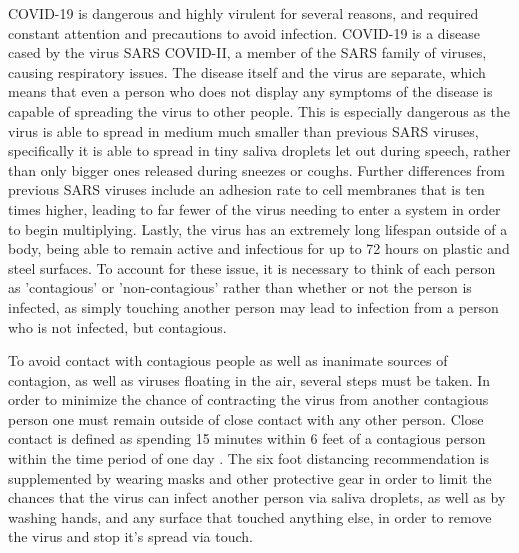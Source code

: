 \documentclass[12pt]{article}
\begin{document}
COVID-19 is dangerous and highly virulent for several reasons, and required constant attention and precautions to avoid infection.
COVID-19 is a disease cased by the virus SARS COVID-II, a member of the SARS family of viruses, causing respiratory issues.
The disease itself and the virus are separate, which means that even a person who does not display any symptoms of the disease is capable of spreading the virus to other people.
This is especially dangerous as the virus is able to spread in medium much smaller than previous SARS viruses, specifically it is able to spread in tiny saliva droplets let out during speech, rather than only bigger ones released during sneezes or coughs.
Further differences from previous SARS viruses include an adhesion rate to cell membranes that is ten times higher, leading to far fewer of the virus needing to enter a system in order to begin multiplying.
Lastly, the virus has an extremely long lifespan outside of a body, being able to remain active and infectious for up to 72 hours on plastic and steel surfaces.
To account for these issue, it is necessary to think of each person as 'contagious' or 'non-contagious' rather than whether or not the person is infected, as simply touching another person may lead to infection from a person who is not infected, but contagious. 

To avoid contact with contagious people as well as inanimate sources of contagion, as well as viruses floating in the air, several steps must be taken.
In order to minimize the chance of contracting the virus from another contagious person one must remain outside of close contact with any other person.
Close contact is defined as spending 15 minutes within 6 feet of a contagious person within the time period of one day \cite{distancing_recommendations}.
The six foot distancing recommendation is supplemented by wearing masks and other protective gear in order to limit the chances that the virus can infect another person via saliva droplets, as well as by washing hands, and any surface that touched anything else, in order to remove the virus and stop it's spread via touch. 

\end{document}
